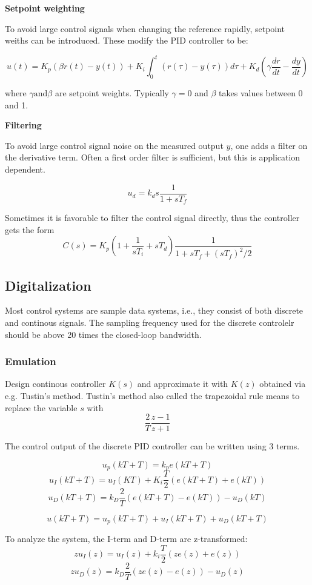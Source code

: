 \textbf{Setpoint weighting}

To avoid large control signals when changing the reference rapidly, setpoint weiths can be introduced.
These modify the PID controller to be:

$$ u(t) = K_p(\beta r(t) -y(t)) + K_i \int_0^t (r(\tau)-y(\tau))d\tau + K_d (\gamma \frac{dr}{dt} - \frac{dy}{dt})$$

where $\gamma \text{and} \beta$ are setpoint weights. Typically $\gamma = 0$ and $\beta$ takes values between
0 and 1.

\textbf{Filtering}

To avoid large control signal noise on the measured output $y$, one adds a filter
on the derivative term. Often a first order filter is sufficient, but this is application dependent.

$$ u_d = k_d s \frac{1}{1+sT_f}$$

Sometimes it is favorable to filter the control signal directly, thus the controller gets the form
$$ C(s) = K_p (1+\frac{1}{sT_i}+sT_d) \frac{1}{1+sT_f+(sT_f)^2/2}$$

\subsection{Digitalization}
Most control systems are sample data systems, i.e., they consist of both discrete and continous signals.
The sampling frequency used for the discrete controlelr should be above 20 times the closed-loop bandwidth.


\subsubsection{Emulation}
Design continous controller $K(s)$ and approximate it with $K(z)$ obtained via e.g. Tustin's method.
Tustin's method also called the trapezoidal rule means to replace the variable $s$ with $$\frac{2}{T} \frac{z-1}{z+1}$$


The control output of the discrete PID controller can be written using 3 terms.

$$u_p(kT+T) = k_p e(kT+T)$$
$$u_I(kT+T) = u_I(KT)+K_i \frac{T}{2} (e(kT+T)+e(kT))$$
$$u_D(kT+T) = k_D \frac{2}{T} (e(kT+T)-e(kT))-u_D(kT)$$

$$u(kT+T) = u_p(kT+T)+u_I(kT+T)+u_D(kT+T)$$

To analyze the system, the I-term and D-term are z-transformed:
$$z u_I(z) = u_I(z) + k_i \frac{T}{2} (ze(z)+e(z))$$
$$z u_D(z) = k_D \frac{2}{T} (ze(z)-e(z))-u_D(z)$$

